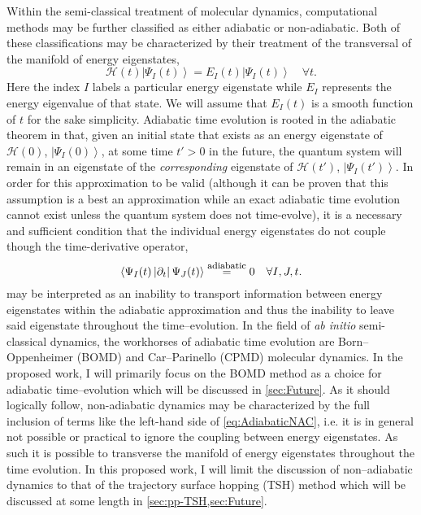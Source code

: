 \documentclass[12pt]{article}
\newcommand{\ket}[1]{\left\vert #1 \right\rangle}         %
\newcommand{\innerop}[3]{\left\langle #1 \left\vert #2 \right\vert #3 \right\rangle}  %
\begin{document}
Within the semi-classical treatment of molecular dynamics, computational methods
may be further classified as either adiabatic or non-adiabatic. Both of these
classifications may be characterized by their treatment of the transversal of
the manifold of energy eigenstates,
\begin{equation}
\mathscr{H}(t) \ket{\Psi_I (t)} = E_I(t) \ket{\Psi_I (t)}
\quad \forall t.
\label{eq:EnergyEig}
\end{equation}
Here the index $I$ labels a particular energy eigenstate while $E_I$ represents
the energy eigenvalue of that state. We will assume that $E_I(t)$ is a smooth
function of $t$ for the sake simplicity. Adiabatic time evolution is rooted in
the adiabatic theorem in that, given an initial state that exists as an energy
eigenstate of $\mathscr{H}(0)$, $\ket{\Psi_I(0)}$, at some time $t' > 0$ in the
future, the quantum system will remain in an eigenstate of the
\emph{corresponding} eigenstate of $\mathscr{H}(t')$, $\ket{\Psi_I(t')}$. In
order for this approximation to be valid (although it can be proven that this
assumption is a best an approximation while an exact adiabatic time evolution
cannot exist unless the quantum system does not time-evolve), it is a
necessary and sufficient condition that the individual energy eigenstates do
not couple though the time-derivative operator,
\begin{equation}
\innerop{\Psi_I(t)}{\partial_t}{\Psi_J (t)}
  \stackrel{\mathrm{\mbox{\footnotesize adiabatic}}}{=} 0
  \quad \forall I,J,t.
  \label{eq:AdiabaticNAC}
\end{equation}
 may be interpreted as an inability to transport
information between energy eigenstates within the adiabatic approximation and
thus the inability to leave said eigenstate throughout the time--evolution.  In
the field of \emph{ab initio} semi-classical dynamics, the workhorses of
adiabatic time evolution are Born--Oppenheimer  (BOMD) and Car--Parinello (CPMD)
molecular dynamics. In the proposed work, I will primarily focus on the BOMD
method as a choice for adiabatic time--evolution which will be discussed in
\cref{sec:Future}.  As it should logically follow, non-adiabatic dynamics may be
characterized by the full inclusion of terms like the left-hand side of
\cref{eq:AdiabaticNAC}, i.e.  it is in general not possible or practical to
ignore the coupling between energy eigenstates. As such it is possible to
transverse the manifold of energy eigenstates throughout the time evolution.
In this proposed work, I will limit the discussion of non--adiabatic dynamics to
that of the trajectory surface hopping (TSH) method which will be discussed at
some length in \cref{sec:pp-TSH,sec:Future}.
\end{document}
